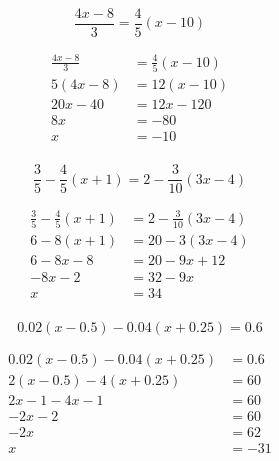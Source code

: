 \documentclass[letterpaper, landscape]{exam}
\begin{document}
\begin{questions}
    \ifprintanswers{}
      \newpage
    \fi

    \question[10]
      \[ 
        \frac{4x - 8}{3} = \frac{4}{5} (x - 10)
      \]

      \begin{solution}
        \begin{align*}
          \frac{4x - 8}{3} & = \frac{4}{5} (x - 10) \\
          5 (4x - 8)       & = 12 (x - 10) \\
          20x - 40         & = 12x - 120 \\
          8x               & = -80 \\
          x                & = \boxed{ -10 } \\
        \end{align*}
      \end{solution}

    \question[10]
      \[
        \frac{3}{5} - \frac{4}{5} (x + 1) = 2 - \frac{3}{10} (3x - 4)
      \]

      \begin{solution}
        \begin{align*}
          \frac{3}{5} - \frac{4}{5} (x + 1) & = 2 - \frac{3}{10} (3x - 4) \\
          6 - 8(x + 1)                      & = 20 - 3 (3x - 4) \\
          6 - 8x - 8                        & = 20 - 9x + 12 \\
          - 8x - 2                          & = 32 - 9x \\
          x                                 & = \boxed{ 34 } \\
        \end{align*}
      \end{solution}

    \question[10] 
      \[
        0.02 (x - 0.5) - 0.04 (x + 0.25) = 0.6
      \]

      \begin{solution}
        \begin{align*}
          0.02 (x - 0.5) - 0.04 (x + 0.25) & = 0.6 \\
          2 (x - 0.5) - 4 (x + 0.25)       & = 60 \\
          2x - 1 - 4x - 1                  & = 60 \\
          -2x - 2                          & = 60 \\
          -2x                              & = 62 \\
          x                                & = \boxed{ -31 } \\
        \end{align*}
      \end{solution}


\end{questions}
\end{document}
